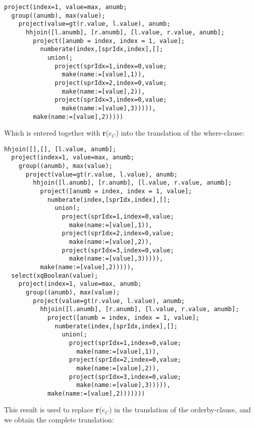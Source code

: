 \begin{Verbatim}
project(index=1, value=max, anumb;
  group((anumb), max(value);
    project(value=gt(r.value, l.value), anumb;
      hhjoin([l.anumb], [r.anumb], [l.value, r.value, anumb];
        project([anumb = index, index = 1, value];
          numberate(index,[sprIdx,index],[];
            union(;
              project(sprIdx=1,index=0,value;
                make(name:=[value],1)),
              project(sprIdx=2,index=0,value;
                make(name:=[value],2)),
              project(sprIdx=3,index=0,value;
                make(name:=[value],3))))),
        make(name:=[value],2)))))
\end{Verbatim}

Which is entered together with \textbf{r}($e_C$) into the translation of the
where-clause:

\begin{Verbatim}
hhjoin([],[], [l.value, anumb];
  project(index=1, value=max, anumb;
    group((anumb), max(value);
      project(value=gt(r.value, l.value), anumb;
        hhjoin([l.anumb], [r.anumb], [l.value, r.value, anumb];
          project([anumb = index, index = 1, value];
            numberate(index,[sprIdx,index],[];
              union(;
                project(sprIdx=1,index=0,value;
                  make(name:=[value],1)),
                project(sprIdx=2,index=0,value;
                  make(name:=[value],2)),
                project(sprIdx=3,index=0,value;
                  make(name:=[value],3))))),
          make(name:=[value],2))))),
  select(xqBoolean(value);
    project(index=1, value=max, anumb;
      group((anumb), max(value);
        project(value=gt(r.value, l.value), anumb;
          hhjoin([l.anumb], [r.anumb], [l.value, r.value, anumb];
            project([anumb = index, index = 1, value];
              numberate(index,[sprIdx,index],[];
                union(;
                  project(sprIdx=1,index=0,value;
                    make(name:=[value],1)),
                  project(sprIdx=2,index=0,value;
                    make(name:=[value],2)),
                  project(sprIdx=3,index=0,value;
                    make(name:=[value],3))))),
            make(name:=[value],2)))))))
\end{Verbatim}

This result is used to replace \textbf{r}($e_C$) in the translation of the
orderby-clause, and we obtain the complete translation:

